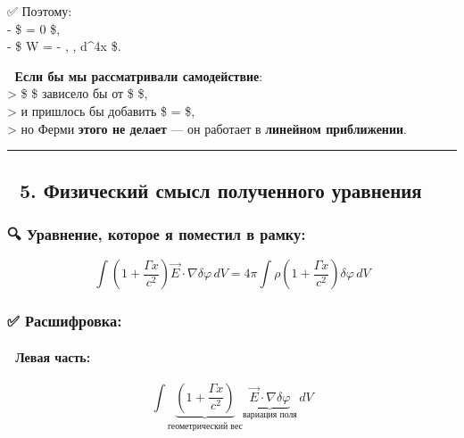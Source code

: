 \documentclass[11pt]{article}
\begin{document}
✅ Поэтому:\\
- \$ \delta \rho = 0 \$,\\
- \$ \delta W = - \int \rho , \delta \varphi , d\^{}4x \$.

📌 \textbf{Если бы мы рассматривали самодействие}:\\
\textgreater{} \$ \rho \$ зависело бы от \$ \varphi \$,\\
\textgreater{} и пришлось бы добавить \$ \delta \rho =
\frac{\partial \rho}{\partial \varphi} \delta \varphi \$,\\
\textgreater{} но Ферми \textbf{этого не делает} --- он работает в
\textbf{линейном приближении}.

\begin{center}\rule{0.5\linewidth}{\linethickness}\end{center}

\subsection{🔹 5. Физический смысл полученного
уравнения}\label{ux444ux438ux437ux438ux447ux435ux441ux43aux438ux439-ux441ux43cux44bux441ux43b-ux43fux43eux43bux443ux447ux435ux43dux43dux43eux433ux43e-ux443ux440ux430ux432ux43dux435ux43dux438ux44f}

\subsubsection{🔍 Уравнение, которое я поместил в
рамку:}\label{ux443ux440ux430ux432ux43dux435ux43dux438ux435-ux43aux43eux442ux43eux440ux43eux435-ux44f-ux43fux43eux43cux435ux441ux442ux438ux43b-ux432-ux440ux430ux43cux43aux443}

\[
\boxed{
\int \left( 1 + \frac{\Gamma x}{c^2} \right) \vec{E} \cdot \nabla \delta \varphi \, dV = 4\pi \int \rho \left( 1 + \frac{\Gamma x}{c^2} \right) \delta \varphi \, dV
}
\]

\subsubsection{✅
Расшифровка:}\label{ux440ux430ux441ux448ux438ux444ux440ux43eux432ux43aux430}

\paragraph{🔹 Левая
часть:}\label{ux43bux435ux432ux430ux44f-ux447ux430ux441ux442ux44c}

\[
\int \underbrace{\left( 1 + \frac{\Gamma x}{c^2} \right)}_{\text{геометрический вес}} \underbrace{\vec{E} \cdot \nabla \delta \varphi}_{\text{вариация поля}} \, dV
\]
\end{document}
